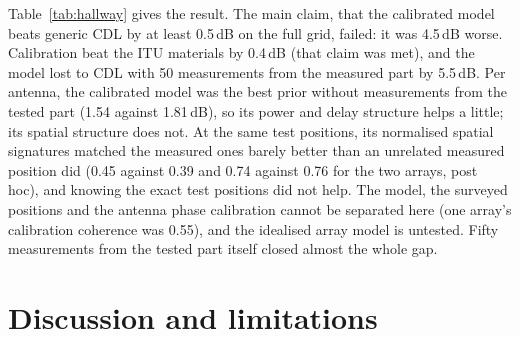\documentclass[11pt]{article}
\begin{document}
Table~\ref{tab:hallway} gives the result. The main claim, that the calibrated
model beats generic CDL by at least 0.5\,dB on the full grid, failed: it was
4.5\,dB worse. Calibration beat the ITU materials by 0.4\,dB (that claim was
met), and the model lost to CDL with 50 measurements from the measured part by
5.5\,dB. Per antenna, the calibrated model was the best prior without
measurements from the tested part (1.54 against 1.81\,dB), so its power and
delay structure helps a little; its spatial structure does not. At the same
test positions, its normalised spatial signatures matched the measured ones
barely better than an unrelated measured position did (0.45 against 0.39 and
0.74 against 0.76 for the two arrays, post hoc), and knowing the exact test
positions did not help. The model, the surveyed positions and the antenna
phase calibration cannot be separated here (one array's calibration coherence
was 0.55), and the idealised array model is untested. Fifty measurements from
the tested part itself closed almost the whole gap.


\section{Discussion and limitations}
\end{document}
